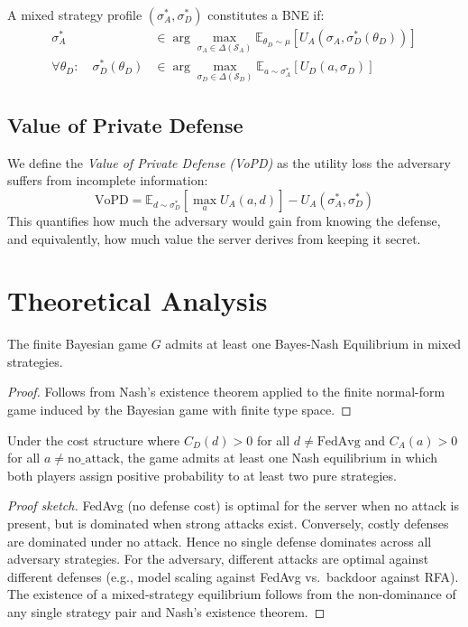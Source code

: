 \documentclass{article}
\newcommand{\SA}{\mathcal{S}_A}
\newcommand{\SD}{\mathcal{S}_D}
\newcommand{\UA}{U_A}
\newcommand{\UD}{U_D}
\newcommand{\thetaD}{\theta_D}
\begin{document}
A mixed strategy profile $(\sigma_A^*, \sigma_D^*)$ constitutes a BNE if:
\begin{align}
    \sigma_A^* &\in \arg\max_{\sigma_A \in \Delta(\SA)} \mathbb{E}_{\thetaD \sim \mu}\left[\UA(\sigma_A, \sigma_D^*(\thetaD))\right] \label{eq:bne_adv}\\
    \forall \thetaD: \quad \sigma_D^*(\thetaD) &\in \arg\max_{\sigma_D \in \Delta(\SD)} \mathbb{E}_{a \sim \sigma_A^*}\left[\UD(a, \sigma_D)\right] \label{eq:bne_srv}
\end{align}

\subsection{Value of Private Defense}

We define the \emph{Value of Private Defense (VoPD)} as the utility loss the adversary suffers from incomplete information:
\begin{equation}
    \text{VoPD} = \mathbb{E}_{d \sim \sigma_D^*}\left[\max_a \UA(a, d)\right] - \UA(\sigma_A^*, \sigma_D^*)
    \label{eq:vopd}
\end{equation}
This quantifies how much the adversary would gain from knowing the defense, and equivalently, how much value the server derives from keeping it secret.

\section{Theoretical Analysis}
\label{sec:theory}

\begin{theorem}[Existence]
The finite Bayesian game $G$ admits at least one Bayes-Nash Equilibrium in mixed strategies.
\end{theorem}
\begin{proof}
Follows from Nash's existence theorem applied to the finite normal-form game induced by the Bayesian game with finite type space.
\end{proof}

\begin{theorem}
Under the cost structure where $C_D(d) > 0$ for all $d \neq \text{FedAvg}$ and $C_A(a) > 0$ for all $a \neq \text{no\_attack}$, the game admits at least one Nash equilibrium in which both players assign positive probability to at least two pure strategies.
\end{theorem}
\begin{proof}[Proof sketch]
FedAvg (no defense cost) is optimal for the server when no attack is present, but is dominated when strong attacks exist. Conversely, costly defenses are dominated under no attack. Hence no single defense dominates across all adversary strategies. For the adversary, different attacks are optimal against different defenses (e.g., model scaling against FedAvg vs.\ backdoor against RFA). The existence of a mixed-strategy equilibrium follows from the non-dominance of any single strategy pair and Nash's existence theorem.
\end{proof}
\end{document}
